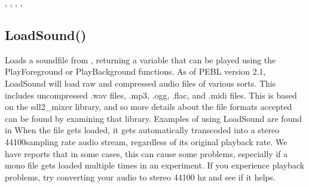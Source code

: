 \documentclass[letterpaper,10pt,english]{sphinxmanual}
\begin{document}
\sphinxAtStartPar
{}

\sphinxAtStartPar
{}, , , , 

\ignorespaces 

\subsection{LoadSound()}
\label{\detokenize{reference/peblobjects:loadsound}}\label{\detokenize{reference/peblobjects:index-19}}
\sphinxAtStartPar
{}

\sphinxAtStartPar
{}

\sphinxAtStartPar
Loads a soundfile from ,  returning a variable that can be played using the PlayForeground or PlayBackground functions.   As of PEBL version 2.1, LoadSound will load raw and compressed audio files of various sorts.  This includes uncompressed .wav files, .mp3, .ogg, .flac, and .midi files. This is based on the sdl2\_mixer library, and so more details about the file formats accepted can be found by examining that library.  Examples of using LoadSound are found in   When the file gets loaded, it gets automatically transcoded into a stereo 44100\sphinxhyphen{}sampling rate audio stream, regardless of its original playback rate.  We have reports that in some cases, this can cause some problems, especially if a mono file gets loaded multiple times in an experiment. If you experience playback problems, try converting your audio to  stereo 44100 hz and see if it helps.

\sphinxAtStartPar
{}

\begin{sphinxVerbatim}[commandchars=\\\{\}]
\end{sphinxVerbatim}

\sphinxAtStartPar
{}

\begin{sphinxVerbatim}[commandchars=\\\{\}]
\end{sphinxVerbatim}
\end{document}
